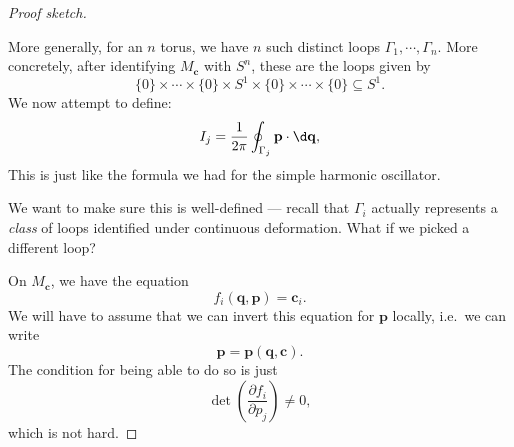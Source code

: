 \documentclass[a4paper]{article}
\begin{document}
\begin{proof}[Proof sketch]
\begin{center}
  \end{center}
  More generally, for an $n$ torus, we have $n$ such distinct loops $\Gamma_1, \cdots, \Gamma_n$. More concretely, after identifying $M_\mathbf{c}$ with $S^n$, these are the loops given by
  \[
    \{0\} \times \cdots \times \{0\} \times S^1 \times \{0\} \times \cdots \times \{0\} \subseteq S^1.
  \]
  We now attempt to define:
  \[
    I_j = \frac{1}{2\pi} \oint_{\Gamma_j} \mathbf{p}\cdot \d \mathbf{q},
  \]
  This is just like the formula we had for the simple harmonic oscillator.

  We want to make sure this is well-defined --- recall that $\Gamma_i$ actually represents a \emph{class} of loops identified under continuous deformation. What if we picked a different loop?
  \begin{center}
  \end{center}
  On $M_\mathbf{c}$, we have the equation
  \[
    f_i(\mathbf{q}, \mathbf{p}) = \mathbf{c}_i.
  \]
  We will have to assume that we can invert this equation for $\mathbf{p}$ locally, i.e.\ we can write
  \[
    \mathbf{p} = \mathbf{p}(\mathbf{q}, \mathbf{c}).
  \]
  The condition for being able to do so is just
  \[
    \det\left(\frac{\partial f_i}{\partial p_j}\right) \not= 0,
  \]
  which is not hard.


\end{proof}
\end{document}
